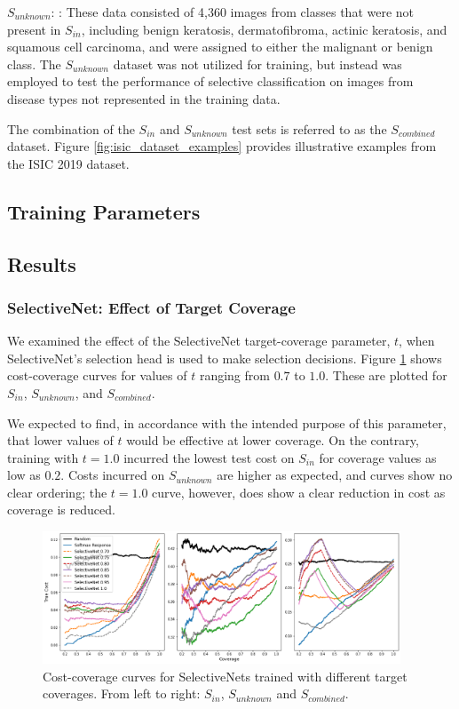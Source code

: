 $S_{unknown}$: : These data consisted of 4,360 images from classes that were not present in $S_{in}$, including benign keratosis, dermatofibroma, actinic keratosis, and squamous cell carcinoma, and were assigned to either the malignant or benign class. The $S_{unknown}$ dataset was not utilized for training, but instead was employed to test the performance of selective classification on images from disease types not represented in the training data.

The combination of the $S_{in}$ and $S_{unknown}$ test sets is referred to as the $S_{combined}$ dataset. Figure \ref{fig:isic_dataset_examples} provides illustrative examples from the ISIC 2019 dataset.


\subsection{Training Parameters}

\subsection{Results}
\subsubsection{SelectiveNet: Effect of Target Coverage}
We examined the effect of the SelectiveNet target-coverage parameter, $t$, when SelectiveNet's selection head is used to make selection decisions. Figure \ref{fig:sn_coverage} shows cost-coverage curves for values of $t$ ranging from $0.7$ to $1.0$. These are plotted for $S_{in}$, $S_{unknown}$, and $S_{combined}$. 

We expected to find, in accordance with the intended purpose of this parameter, that lower values of $t$ would be effective at lower coverage. On the contrary, training with $t=1.0$ incurred the lowest test cost on $S_{in}$ for coverage values as low as $0.2$. Costs incurred on $S_{unknown}$ are higher as expected, and curves show no clear ordering; the $t=1.0$ curve, however, does show a clear reduction in cost as coverage is reduced.

\begin{figure}[h]
	\centering
	\includegraphics[width=0.95\textwidth]{images/selectivenet_v2.png}
	\caption{Cost-coverage curves for SelectiveNets trained with different target coverages. From left to right: \(S_{in}\), \(S_{unknown}\) and  \(S_{combined}\).}
	\label{fig:sn_coverage}
\end{figure}

